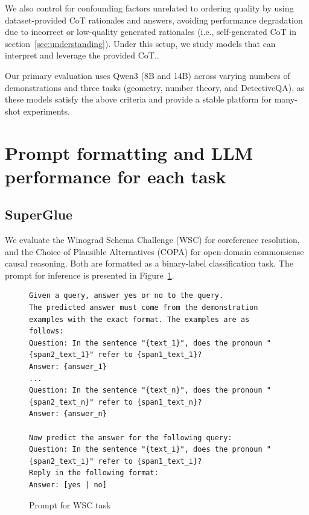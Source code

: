 \documentclass{llmxive}
\begin{document}
We also control for confounding factors unrelated to ordering quality by using dataset-provided CoT rationales and answers, avoiding performance degradation due to incorrect or low-quality generated rationales (i.e., self-generated CoT in section~\ref{sec:understanding}).
Under this setup, we study models that can interpret and leverage the provided CoT..

Our primary evaluation uses Qwen3 (8B and 14B) across varying numbers of demonstrations and three tasks (geometry, number theory, and DetectiveQA), as these models satisfy the above criteria and provide a stable platform for many-shot experiments.



\section{Prompt formatting and LLM performance for each task}
\label{sc:apx_tasks}

\subsection{SuperGlue}

We evaluate the Winograd Schema Challenge (WSC) for coreference resolution, and the Choice of Plausible Alternatives (COPA) for open-domain commonsense causal reasoning. Both are formatted as a binary-label classification task. The prompt for inference is presented in Figure~\ref{fig:prompt_wsc}. %



\begin{figure}
    \centering
    {\tiny
\begin{lstlisting}
Given a query, answer yes or no to the query.
The predicted answer must come from the demonstration examples with the exact format. The examples are as follows:
Question: In the sentence "{text_1}", does the pronoun "{span2_text_1}" refer to {span1_text_1}?
Answer: {answer_1}
...
Question: In the sentence "{text_n}", does the pronoun "{span2_text_n}" refer to {span1_text_n}?
Answer: {answer_n}

Now predict the answer for the following query:
Question: In the sentence "{text_i}", does the pronoun "{span2_text_i}" refer to {span1_text_i}?
Reply in the following format:
Answer: [yes | no]
\end{lstlisting}
}
    \caption{Prompt for WSC task}
    \label{fig:prompt_wsc}

\end{figure}
\end{document}
